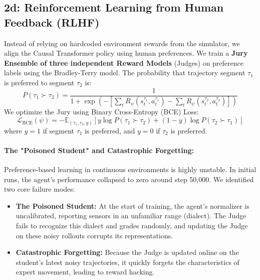 \documentclass[11pt,a4paper]{article}
\begin{document}
\subsection{2d: Reinforcement Learning from Human Feedback (RLHF)}
Instead of relying on hardcoded environment rewards from the simulator, we align the Causal Transformer policy using human preferences. We train a \textbf{Jury Ensemble of three independent Reward Models} (Judges) on preference labels using the Bradley-Terry model. The probability that trajectory segment $\tau_1$ is preferred to segment $\tau_2$ is:
\begin{equation}
P(\tau_1 \succ \tau_2) = \frac{1}{1 + \exp\left( - \left[ \sum_{t} R_\psi(s_t^{\tau_1}, a_t^{\tau_1}) - \sum_{t} R_\psi(s_t^{\tau_2}, a_t^{\tau_2}) \right] \right)}
\end{equation}
We optimize the Jury using Binary Cross-Entropy (BCE) Loss:
\begin{equation}
\mathcal{L}_{\text{BCE}}(\psi) = - \mathbb{E}_{(\tau_1, \tau_2, y)} \left[ y \log P(\tau_1 \succ \tau_2) + (1-y) \log P(\tau_2 \succ \tau_1) \right]
\end{equation}
where $y=1$ if segment $\tau_1$ is preferred, and $y=0$ if $\tau_2$ is preferred.

\paragraph{The "Poisoned Student" and Catastrophic Forgetting:}
Preference-based learning in continuous environments is highly unstable. In initial runs, the agent's performance collapsed to zero around step 50,000. We identified two core failure modes:
\begin{itemize}
    \item \textbf{The Poisoned Student:} At the start of training, the agent's normalizer is uncalibrated, reporting sensors in an unfamiliar range (dialect). The Judge fails to recognize this dialect and grades randomly, and updating the Judge on these noisy rollouts corrupts its representations.
    \item \textbf{Catastrophic Forgetting:} Because the Judge is updated online on the student's latest noisy trajectories, it quickly forgets the characteristics of expert movement, leading to reward hacking.
\end{itemize}
\end{document}
